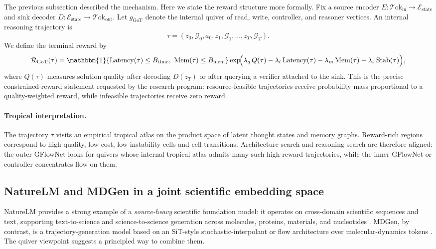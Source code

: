 \documentclass[11pt]{article}
\theoremstyle{definition}
\theoremstyle{plain}
\theoremstyle{remark}
\newcommand{\mc}[1]{\mathcal{#1}}
\newcommand{\Emb}{\mc{E}}
\newcommand{\Tok}{\mc{T}\mathrm{ok}}
\newcommand{\Reward}{\mc{R}}
\begin{document}
The previous subsection described the mechanism.
Here we state the reward structure more formally.
Fix a source encoder $E:\Tok_{\mathrm{in}}\to \Emb_{\mathrm{state}}$ and sink decoder $D:\Emb_{\mathrm{state}}\to \Tok_{\mathrm{out}}$.
Let $g_{\mathrm{GoT}}$ denote the internal quiver of read, write, controller, and reasoner vertices.
An internal reasoning trajectory is
\[
\tau=(z_0,\mc{G}_0,a_0,z_1,\mc{G}_1,\ldots,z_T,\mc{G}_T).
\]
We define the terminal reward by
\[
\Reward_{\mathrm{GoT}}(\tau)
=
\mathbbm{1}\{\mathrm{Latency}(\tau)\le B_{\mathrm{time}},\ \mathrm{Mem}(\tau)\le B_{\mathrm{mem}}\}
\exp\!\Bigl(
\lambda_q\,Q(\tau)
-\lambda_t\,\mathrm{Latency}(\tau)
-\lambda_m\,\mathrm{Mem}(\tau)
-\lambda_s\,\mathrm{Stab}(\tau)
\Bigr),
\]
where $Q(\tau)$ measures solution quality after decoding $D(z_T)$ or after querying a verifier attached to the sink.
This is the precise constrained-reward statement requested by the research program:
resource-feasible trajectories receive probability mass proportional to a quality-weighted reward, while infeasible trajectories receive zero reward.

\paragraph{Tropical interpretation.}
The trajectory $\tau$ visits an empirical tropical atlas on the product space of latent thought states and memory graphs.
Reward-rich regions correspond to high-quality, low-cost, low-instability cells and cell transitions.
Architecture search and reasoning search are therefore aligned:
the outer GFlowNet looks for quivers whose internal tropical atlas admits many such high-reward trajectories, while the inner GFlowNet or controller concentrates flow on them.

\subsection{NatureLM and MDGen in a joint scientific embedding space}
\label{sec:naturelm-mdgen}

NatureLM provides a strong example of a \emph{source-heavy} scientific foundation model:
it operates on cross-domain scientific sequences and text, supporting text-to-science and science-to-science generation across molecules, proteins, materials, and nucleotides \cite{NatureLM2025}.
MDGen, by contrast, is a trajectory-generation model based on an SiT-style stochastic-interpolant or flow architecture over molecular-dynamics tokens \cite{MDGen2024}.
The quiver viewpoint suggests a principled way to combine them.
\end{document}
